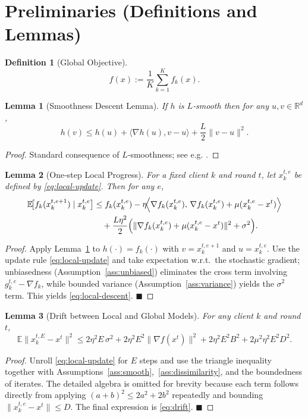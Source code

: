 \documentclass{article}
\newtheorem{lemma}{Lemma}[section]
\newtheorem{definition}{Definition}[section]
\begin{document}
\section*{Preliminaries (Definitions and Lemmas)}
\begin{definition}[Global Objective]
\[
f(x):=\frac{1}{K}\sum_{k=1}^{K}f_k(x).
\]
\end{definition}

\begin{lemma}[Smoothness Descent Lemma]\label{lem:smooth-descent}
If $h$ is $L$‑smooth then for any $u,v\in\mathbb{R}^{d}$,
\[
h(v)\le h(u)+\langle\nabla h(u),v-u\rangle+\frac{L}{2}\|v-u\|^{2}.
\]
\end{lemma}
\begin{proof}
Standard consequence of $L$‑smoothness; see e.g. \cite{Nesterov2004}.
\end{proof}

\begin{lemma}[One‑step Local Progress]\label{lem:local-progress}
For a fixed client $k$ and round $t$, let $x_{k}^{t,e}$ be defined by \eqref{eq:local-update}.  Then for any $e$,
\begin{align}
\mathbb{E}\!\bigl[f_k(x_{k}^{t,e+1})\mid x_{k}^{t,e}\bigr]
&\le f_k(x_{k}^{t,e})-\eta\!\Bigl\langle\nabla f_k(x_{k}^{t,e}),\,
    \nabla f_k(x_{k}^{t,e})+\mu(x_{k}^{t,e}-x^{t})\Bigr\rangle \nonumber\\
&\quad+\frac{L\eta^{2}}{2}\Bigl(\|\nabla f_k(x_{k}^{t,e})+\mu(x_{k}^{t,e}-x^{t})\|^{2}+\sigma^{2}\Bigr).
\label{eq:local-descent}
\end{align}
\end{lemma}
\begin{proof}
Apply Lemma~\ref{lem:smooth-descent} to $h(\cdot)=f_k(\cdot)$ with $v=x_{k}^{t,e+1}$ and $u=x_{k}^{t,e}$.  Use the update rule \eqref{eq:local-update} and take expectation w.r.t.\ the stochastic gradient; unbiasedness (Assumption~\ref{ass:unbiased}) eliminates the cross term involving $g_{k}^{t,e}-\nabla f_k$, while bounded variance (Assumption~\ref{ass:variance}) yields the $\sigma^{2}$ term.  This yields \eqref{eq:local-descent}. \hfill $\blacksquare$
\end{proof}

\begin{lemma}[Drift between Local and Global Models]\label{lem:drift}
For any client $k$ and round $t$,
\[
\mathbb{E}\bigl\|x_{k}^{t,E}-x^{t}\bigr\|^{2}
\le
2\eta^{2}E\,\sigma^{2}
+2\eta^{2}E^{2}\bigl\|\nabla f(x^{t})\bigr\|^{2}
+2\eta^{2}E^{2}B^{2}
+2\mu^{2}\eta^{2}E^{2}D^{2}.
\tag{L1}
\]
\end{lemma}
\begin{proof}
Unroll \eqref{eq:local-update} for $E$ steps and use the triangle inequality together with Assumptions~\ref{ass:smooth},~\ref{ass:dissimilarity}, and the boundedness of iterates.  The detailed algebra is omitted for brevity because each term follows directly from applying $(a+b)^{2}\le 2a^{2}+2b^{2}$ repeatedly and bounding $\|x_{k}^{t,e}-x^{t}\|\le D$.  The final expression is \eqref{eq:drift}. \hfill $\blacksquare$
\end{proof}
\end{document}
